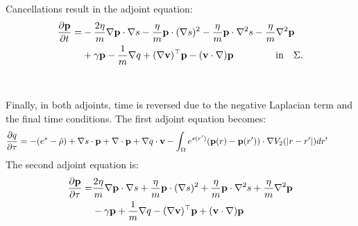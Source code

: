Cancellations result in the adjoint equation:
\begin{align*}
\frac{\partial \mathbf{p}}{\partial t} =& 
- \frac{2 \eta}{m} \nabla \mathbf{p} \cdot \nabla s - \frac{\eta}{m} \mathbf{p} \cdot (\nabla s)^2 - \frac{\eta}{m} \mathbf{p} \cdot \nabla^2 s - \frac{\eta}{m} \nabla^2 \mathbf{p} \\
&  +\gamma  \mathbf{p}-\frac{1}{m} \nabla q + (\nabla \mathbf{v})^\top\mathbf{p} - (\mathbf{v} \cdot \nabla)\mathbf{p}   \ \qquad\qquad \text{in} \quad \Sigma.
\end{align*}
\\
\\
Finally, in both adjoints, time is reversed due to the negative Laplacian term and the final time conditions. 
The first adjoint equation becomes:
\begin{align*}
& \frac{\partial q}{\partial \tau} = - (e^s - \hat \rho)  + \nabla s \cdot \mathbf{p} + \nabla\cdot \mathbf{p}  +  \nabla q \cdot \mathbf{v} - \int_\Omega  e^{s(r')}(\mathbf{p}(r) - \mathbf{p}(r')) \cdot\nabla V_2(|r-r'|)   dr'   \qquad 
\end{align*}
The second adjoint equation is:
\begin{align*}
\frac{\partial \mathbf{p}}{\partial \tau} =& 
 \frac{2 \eta}{m} \nabla \mathbf{p} \cdot \nabla s + \frac{\eta}{m} \mathbf{p} \cdot (\nabla s)^2 + \frac{\eta}{m} \mathbf{p} \cdot \nabla^2 s + \frac{\eta}{m} \nabla^2 \mathbf{p} \\
&  -\gamma  \mathbf{p} + \frac{1}{m} \nabla q - (\nabla \mathbf{v})^\top\mathbf{p} + (\mathbf{v} \cdot \nabla)\mathbf{p}
\end{align*}